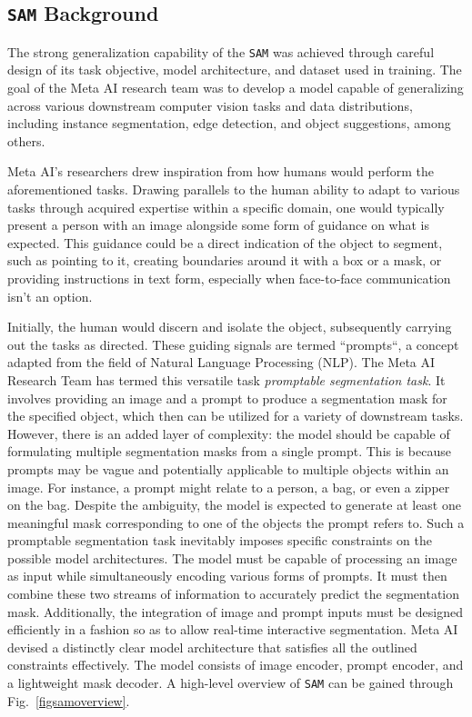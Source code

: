 \subsection{\texttt{SAM} Background}\label{SAMbg}
The strong generalization capability of the \texttt{SAM} was achieved through careful design of its task objective, model architecture, and dataset used in training. The goal of the Meta AI research team was to develop a model capable of generalizing across various downstream computer vision tasks and data distributions, including instance segmentation, edge detection, and object suggestions, among others.

Meta AI's researchers drew inspiration from how humans would perform the aforementioned tasks. Drawing parallels to the human ability to adapt to various tasks through acquired expertise within a specific domain, one would typically present a person with an image alongside some form of guidance on what is expected. This guidance could be a direct indication of the object to segment, such as pointing to it, creating boundaries around it with a box or a mask, or providing instructions in text form, especially when face-to-face communication isn't an option.

Initially, the human would discern and isolate the object, subsequently carrying out the tasks as directed. These guiding signals are termed “prompts“, a concept adapted from the field of Natural Language Processing (NLP). The Meta AI Research Team has termed this versatile task \textit{promptable segmentation task}. It involves providing an image and a prompt to produce a segmentation mask for the specified object, which then can be utilized for a variety of downstream tasks. However, there is an added layer of complexity: the model should be capable of formulating multiple segmentation masks from a single prompt. This is because prompts may be vague and potentially applicable to multiple objects within an image. For instance, a prompt might relate to a person, a bag, or even a zipper on the bag. Despite the ambiguity, the model is expected to generate at least one meaningful mask corresponding to one of the objects the prompt refers to.
Such a promptable segmentation task inevitably imposes specific constraints on the possible model architectures. The model must be capable of processing an image as input while simultaneously encoding various forms of prompts. It must then combine these two streams of information to accurately predict the segmentation mask. Additionally, the integration of image and prompt inputs must be designed efficiently in a fashion so as to allow real-time interactive segmentation. 
Meta AI devised a distinctly clear model architecture that satisfies all the outlined constraints effectively. The model consists of image encoder, prompt encoder, and a lightweight mask decoder. A high-level overview of \texttt{SAM} can be gained through Fig.~\ref{figsamoverview}.

